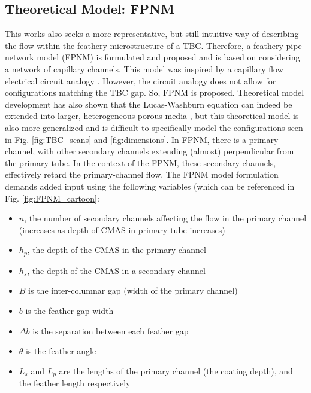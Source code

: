\documentclass[%
 aip,
 amsmath,amssymb,
 reprint,%
floatfix]{revtex4-1}
\begin{document}
\subsection{Theoretical Model: FPNM}
\label{sec:pipeNetworkMethod}
This works also seeks a more representative, but still intuitive way of describing the flow within the feathery microstructure of a TBC. Therefore, a feathery-pipe-network model (FPNM)  is formulated and proposed and is based on considering a network of capillary channels. This model was inspired by a capillary flow electrical circuit analogy \cite{Mikaelian2020}. However, the circuit analogy does not allow for configurations matching the TBC gap. So, FPNM is proposed. Theoretical model development has also shown that the Lucas-Washburn equation can indeed be extended into larger, heterogeneous porous media \cite{Cai2021, WAGHMARE2010561}, but this theoretical model is also more generalized and is difficult to specifically model the configurations seen in Fig. \ref{fig:TBC_scans} and \ref{fig:dimensions}.
In FPNM, there is a primary channel, with other secondary channels extending (almost) perpendicular from the primary tube. In the context of the FPNM, these secondary channels, effectively retard the primary-channel flow. The FPNM model formulation demands added input using the following variables (which can be referenced in Fig. \ref{fig:FPNM_cartoon}:

\begin{itemize}
    \item $n$, the number of secondary channels affecting the flow in the primary channel (increases as depth of CMAS in primary tube increases)
    \item $h_{p}$, the depth of the CMAS in the primary channel
    \item $h_{s}$, the depth of the CMAS in a secondary channel
    \item $B$ is the inter-columnar gap (width of the primary channel)
    \item $b$ is the feather gap width
    \item $\Delta b$ is the separation between each feather gap
    \item $\theta$ is the feather angle
    \item $L_{s}$ and $L_{p}$ are the lengths of the primary channel (the coating depth), and the feather length respectively
\end{itemize}
\end{document}
